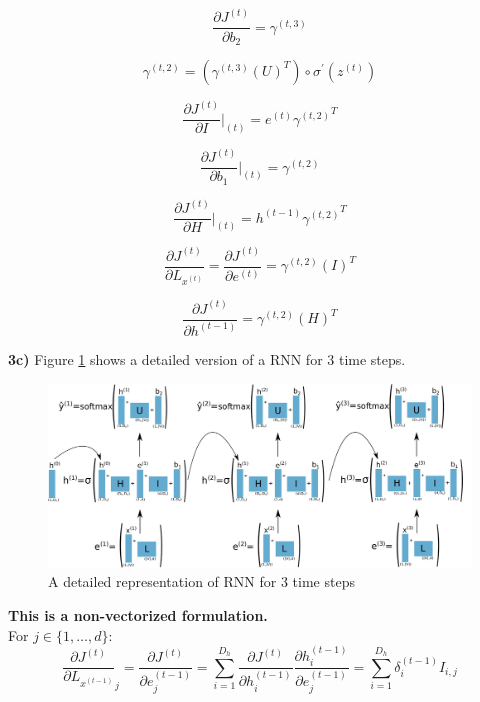 \documentclass{article}
\begin{document}
\begin{equation}\label{eq:38}
\frac{\partial J^{(t)}}{\partial  b_{2}} =  \gamma^{(t,3)}
\end{equation}

\begin{equation}\label{eq:39}
\gamma^{(t,2)} = (\gamma^{(t,3)} {(U)}^{T}) \circ \sigma^{\prime}(z^{(t)})
\end{equation}

\begin{equation}\label{eq:40}
\frac{\partial J^{(t)}}{\partial I}\vert_{(t)} = {e^{(t)} \gamma^{(t,2)}}^{T}
\end{equation}

\begin{equation}\label{eq:41}
\frac{\partial J^{(t)}}{\partial  b_{1}}\vert_{(t)} =  \gamma^{(t,2)}
\end{equation}

\begin{equation}\label{eq:42}
\frac{\partial J^{(t)}}{\partial H}\vert_{(t)} = {h^{(t-1)} \gamma^{(t,2)}}^{T}
\end{equation}

\begin{equation}\label{eq:43}
\frac{\partial J^{(t)}}{\partial L_{x^{(t)}}} =\frac{\partial J^{(t)}}{\partial e^{(t)}} = \gamma^{(t,2)} {(I)}^{T}
\end{equation}


\begin{equation}\label{eq:44}
\frac{\partial J^{(t)}}{\partial h^{(t-1)}} = \gamma^{(t,2)} {(H)}^{T}
\end{equation}

\vspace{1.cm}
\textbf{3c)} Figure \ref{RNN3} shows a detailed version of a RNN for 3 time steps.
\begin{figure}[H] 
\begin{center}
\includegraphics[scale=0.66]{RNN3.pdf}
\end{center}
\caption{A detailed representation of RNN for 3 time steps}
\label{RNN3}
\end{figure}
\textbf{This is a non-vectorized formulation.}\\
For $j \in \{1, \dots, d\}$:
\begin{equation}\label{eq:45}
\frac{\partial J^{(t)}}{\partial {L_{x^{(t-1)}}}}_{j} =\frac{\partial J^{(t)}}{\partial e^{(t-1)}_{j}} =\sum_{i=1}^{D_{h}}\frac{\partial J^{(t)}}{\partial h^{(t-1)}_{i}}\frac{\partial  h^{(t-1)}_{i}}{\partial  e^{(t-1)}_{j}}  = \sum_{i=1}^{D_{h}}\delta^{(t-1)}_{i}I_{i,j}
\end{equation}
\end{document}
